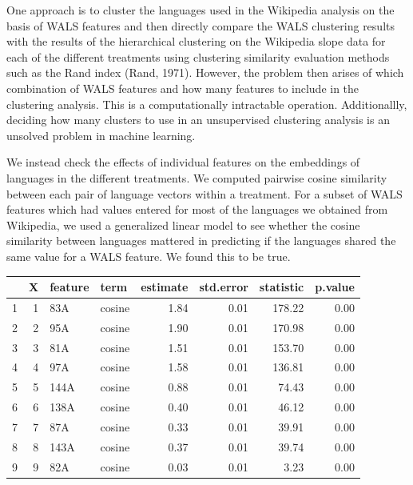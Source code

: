 \documentclass[10pt, letterpaper]{article}
\newenvironment{CodeChunk}{}{}
\begin{document}
One approach is to cluster the languages used in the Wikipedia analysis
on the basis of WALS features and then directly compare the WALS
clustering results with the results of the hierarchical clustering on
the Wikipedia slope data for each of the different treatments using
clustering similarity evaluation methods such as the Rand index (Rand,
1971). However, the problem then arises of which combination of WALS
features and how many features to include in the clustering analysis.
This is a computationally intractable operation. Additionallly, deciding
how many clusters to use in an unsupervised clustering analysis is an
unsolved problem in machine learning.

We instead check the effects of individual features on the embeddings of
languages in the different treatments. We computed pairwise cosine
similarity between each pair of language vectors within a treatment. For
a subset of WALS features which had values entered for most of the
languages we obtained from Wikipedia, we used a generalized linear model
to see whether the cosine similarity between languages mattered in
predicting if the languages shared the same value for a WALS feature. We
found this to be true.

\begin{CodeChunk}
\begin{CodeOutput}
\begin{table}[H]
\centering
\begin{tabular}{rrllrrrr}
  \hline
 & X & feature & term & estimate & std.error & statistic & p.value \\ 
  \hline
1 &   1 & 83A & cosine & 1.84 & 0.01 & 178.22 & 0.00 \\ 
  2 &   2 & 95A & cosine & 1.90 & 0.01 & 170.98 & 0.00 \\ 
  3 &   3 & 81A & cosine & 1.51 & 0.01 & 153.70 & 0.00 \\ 
  4 &   4 & 97A & cosine & 1.58 & 0.01 & 136.81 & 0.00 \\ 
  5 &   5 & 144A & cosine & 0.88 & 0.01 & 74.43 & 0.00 \\ 
  6 &   6 & 138A & cosine & 0.40 & 0.01 & 46.12 & 0.00 \\ 
  7 &   7 & 87A & cosine & 0.33 & 0.01 & 39.91 & 0.00 \\ 
  8 &   8 & 143A & cosine & 0.37 & 0.01 & 39.74 & 0.00 \\ 
  9 &   9 & 82A & cosine & 0.03 & 0.01 & 3.23 & 0.00 \\ 
   \hline
\end{tabular}
\end{table}
\end{CodeOutput}
\end{CodeChunk}
\end{document}
